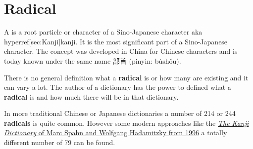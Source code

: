 \section{Radical}
\label{sec:Radical}

A  is a root particle or character of a
Sino-Japanese character aka \\hyperref[sec:Kanji]{kanji}. It is the most
significant part of a Sino-Japanese character. The concept was developed in
China for Chinese characters and is today known under the same name {部首}
(pinyin: bùshǒu).

There is no general definition what a \textbf{radical} is or how many are
existing and it can vary a lot. The author of a dictionary has the power to
defined what a \textbf{radical} is and how much there will be in that
dictionary.

In more traditional Chinese or Japanese dictionaries a number of 214 or 244
\textbf{radicals} is quite common. However some modern approaches like the
\Link \href{https://www.hadamitzky.de/english/works_books.htm#KD}{\textit{The
Kanji Dictionary} of Marc Spahn and Wolfgang Hadamitzky from 1996} a totally
different number of 79 can be found.


